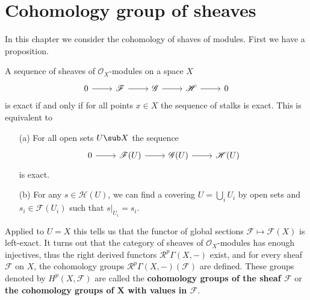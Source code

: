 \chapter{Cohomology group of sheaves}
In this chapter we consider the cohomology of shaves of modules. First we have a proposition.
\begin{proposition}
A sequence of sheaves of $\mathscr{O}_X$-modules on a space $X$
\[\begin{tikzcd}
0\ar[r]&\mathscr{F}\ar[r]&\mathscr{G}\ar[r]&\mathscr{H}\ar[r]&0
\end{tikzcd}\]
is exact if and only if for all points $x\in X$ the sequence of stalks is exact. This is equivalent to
\begin{itemize}
\item[(a)] For all open sets $U\sub X$ the sequence
\[\begin{tikzcd}
0\ar[r]&\mathscr{F}(U)\ar[r]&\mathscr{G}(U)\ar[r]&\mathscr{H}(U)
\end{tikzcd}\]
is exact.
\item[(b)] For any $s\in\mathscr{H}(U)$, we can find a covering $U=\bigcup_iU_i$ by open sets and $s_i\in\mathscr{F}(U_i)$ such that $s|_{U_i}=s_i$.
\end{itemize}
\end{proposition}
Applied to $U=X$ this tells us that the functor of global sections $\mathscr{F}\mapsto\mathscr{F}(X)$ is left-exact. It turns out that the category of sheaves of $\mathscr{O}_X$-modules has enough injectives, thus the right derived functors $\mathcal{R}^p\Gamma(X,-)$ exist, and for every sheaf $\mathscr{F}$ on $X$, the cohomology groups $\mathcal{R}^p\Gamma(X,-)(\mathscr{F})$ are defined. These groups denoted by $H^p(X,\mathscr{F})$ are called the \textbf{cohomology groups of the sheaf $\mathscr{F}$} or \textbf{the cohomology groups of $\bm{X}$ with values in $\mathscr{F}$}.
